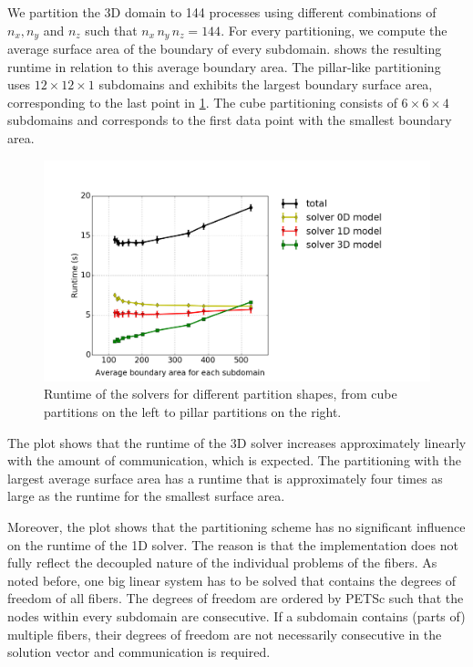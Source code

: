 We partition the 3D domain to 144 processes using different combinations of $n_x,n_y$ and $n_z$ such that $n_x\,n_y\,n_z=144$. 
For every partitioning, we compute the average surface area of the boundary of every subdomain. 
 shows the resulting runtime in relation to this average boundary area.
The pillar-like partitioning uses $12 \times 12 \times 1$ subdomains and exhibits the largest boundary surface area, corresponding to the last point in \cref{fig:opencmiss_partition_shape}. The cube partitioning consists of $6 \times 6 \times 4$ subdomains and corresponds to the first data point with the smallest boundary area.

\begin{figure}
  \centering%
  \includegraphics[width=\textwidth]{images/results/studies/opencmiss_partition_shape.png}%
  \caption{Runtime of the solvers for different partition shapes, from cube partitions on the left to pillar partitions on the right.\protect\footnotemark}%
  \label{fig:opencmiss_partition_shape}%
\end{figure}%

The plot shows that the runtime of the 3D solver increases approximately linearly with the amount of communication, which is expected.
The partitioning with the largest average surface area has a runtime that is approximately four times as large as the runtime for the smallest surface area.

Moreover, the plot shows that the partitioning scheme has no significant influence on the runtime of the 1D solver. The reason is that the implementation does not fully reflect the decoupled nature of the individual problems of the fibers. As noted before, one big linear system has to be solved that contains the degrees of freedom of all fibers. The degrees of freedom are ordered by PETSc such that the nodes within every subdomain are consecutive. If a subdomain contains (parts of) multiple fibers, their degrees of freedom are not necessarily consecutive in the solution vector and communication is required.

